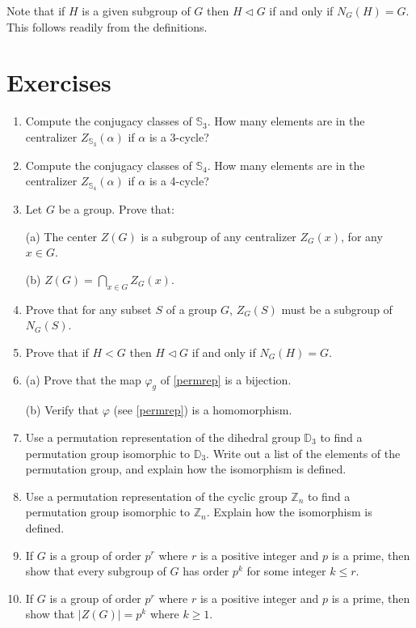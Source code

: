 \documentclass[11pt,oneside]{article}
\newenvironment{problems}
{
 \begin{enumerate}[topsep=1pt,itemsep=0pt,parsep=2pt,leftmargin=0.6cm,%
 label={\arabic*.}, ref=\arabic*] \small
}
{
 \end{enumerate}
}
\theoremstyle{definition}
\newcommand{\Z}{\mathbb{Z}} %
\newcommand{\Sym}{\mathbb{S}}
\newcommand{\D}{\mathbb{D}}
\begin{document}
 
Note that if $H$ is a given subgroup of $G$ then $H \triangleleft G$
if and only if $N_G(H) = G$. This follows readily from the definitions. 

\section*{Exercises}

\begin{problems}

\item Compute the conjugacy classes of $\Sym_3$. How many elements are
  in the centralizer $Z_{\Sym_3}(\alpha)$ if $\alpha$ is a 3-cycle?

\item Compute the conjugacy classes of $\Sym_4$. How many elements are
  in the centralizer $Z_{\Sym_4}(\alpha)$ if $\alpha$ is a 4-cycle?

\item Let $G$ be a group. Prove that:
\par(a) The center $Z(G)$ is a subgroup of any centralizer $Z_G(x)$,
for any $x\in G$. 
\par(b) $Z(G) = \bigcap_{x\in G} Z_G(x)$. 

\item Prove that for any subset $S$ of a group $G$, $Z_G(S)$ must be a
  subgroup of $N_G(S)$. 

\item Prove that if $H < G$ then $H \triangleleft G$ if and only if
  $N_G(H) = G$.

\item (a) Prove that the map $\varphi_g$ of \ref{permrep} is a bijection. 
\par (b) Verify that $\varphi$ (see \ref{permrep}) is a homomorphism.

\item Use a permutation representation of the dihedral group $\D_3$ to
  find a permutation group isomorphic to $\D_3$. Write out a list of
  the elements of the permutation group, and explain how the
  isomorphism is defined.

\item Use a permutation representation of the cyclic group $\Z_n$ to
  find a permutation group isomorphic to $\Z_n$. Explain how the
  isomorphism is defined.

\item If $G$ is a group of order $p^r$ where $r$ is a positive integer
  and $p$ is a prime, then show that every subgroup of $G$ has order
  $p^k$ for some integer $k \le r$.

\item If $G$ is a group of order $p^r$ where $r$ is a positive integer
  and $p$ is a prime, then show that $|Z(G)| = p^k$ where $k \ge 1$.

\end{problems}
\end{document}
